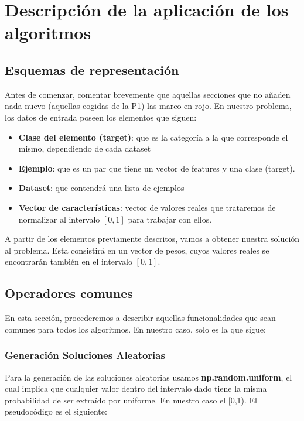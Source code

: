 \documentclass[10pt, a4paper]{article}
\theoremstyle{theorem-style}
\theoremstyle{theorem-style}
\theoremstyle{theorem2-style}
\theoremstyle{definition-style}
\theoremstyle{remark-style}
\theoremstyle{example-style}
\theoremstyle{definition-style}
\theoremstyle{remark-style}
\theoremstyle{remark-style}
\begin{document}
\section{Descripción de la aplicación de los algoritmos}

\subsection{Esquemas de representación}
\textcolor{ugrColor}{Antes de comenzar, comentar brevemente que aquellas secciones que no añaden nada nuevo (aquellas cogidas de la P1) las marco en rojo}. En nuestro problema, los datos de entrada poseen los elementos que siguen: 
\begin{itemize}	
	\item \textbf{Clase del elemento (target)}: que es la categoría a la que corresponde el mismo, dependiendo de cada dataset
	\item \textbf{Ejemplo}: que es un par que tiene un vector de features y una clase (target).
	\item \textbf{Dataset}: que contendrá una lista de ejemplos
	\item \textbf{Vector de características}: vector de valores reales que trataremos de normalizar al intervalo $[0,1]$ para trabajar con ellos.	

\end{itemize}
A partir de los elementos previamente descritos, vamos a obtener nuestra solución al problema. Esta consistirá en un vector de pesos, cuyos valores reales se encontrarán también en el intervalo $[0,1]$.

\subsection{Operadores comunes}
En esta sección, procederemos a describir aquellas funcionalidades que sean comunes para todos los algoritmos. En nuestro caso, solo es la que sigue: 

\subsubsection{Generación Soluciones Aleatorias}

Para la generación de las soluciones aleatorias usamos \textbf{np.random.uniform}, el cual implica que cualquier valor dentro del intervalo dado tiene la misma probabilidad de ser extraído por uniforme. En nuestro caso el [0,1). El pseudocódigo es el siguiente: \\
\end{document}

